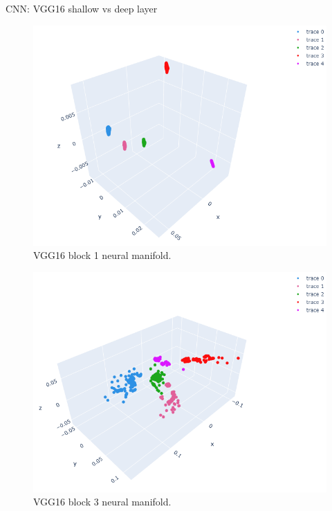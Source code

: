 \documentclass[xcolor={dvipsnames,svgnames}]{beamer}
\begin{document}
\begin{frame}{CNN: VGG16 shallow vs deep layer}

    \begin{minipage}[t]{.45\linewidth}  
    \begin{figure}
            \includegraphics[width=\textwidth]{presentation/embeddings/VGG16-2D-block1.png}
             \caption{VGG16 block 1 neural manifold.}
        \end{figure} 
    \end{minipage}
      \begin{minipage}[t]{.45\linewidth}   
      \begin{figure}         \includegraphics[width=\textwidth]{presentation/embeddings/VGG16-2D-block3.png}
      \caption{VGG16 block 3 neural manifold.}
            \end{figure} 
    \end{minipage}
\end{frame}
\end{document}
